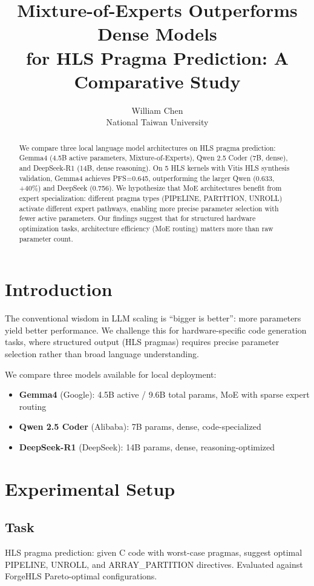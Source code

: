 \documentclass[11pt]{article}
\title{Mixture-of-Experts Outperforms Dense Models\\
for HLS Pragma Prediction: A Comparative Study}
\author{William Chen\\National Taiwan University}
\date{}
\begin{document}
\maketitle

\begin{abstract}
We compare three local language model architectures on HLS pragma
prediction: Gemma4 (4.5B active parameters, Mixture-of-Experts),
Qwen 2.5 Coder (7B, dense), and DeepSeek-R1 (14B, dense reasoning).
On 5 HLS kernels with Vitis HLS synthesis validation, Gemma4 achieves
PFS=0.645, outperforming the larger Qwen (0.633, +40\%) and DeepSeek
(0.756). We hypothesize that MoE architectures benefit from expert
specialization: different pragma types (PIPELINE, PARTITION, UNROLL)
activate different expert pathways, enabling more precise parameter
selection with fewer active parameters. Our findings suggest that
for structured hardware optimization tasks, architecture efficiency
(MoE routing) matters more than raw parameter count.
\end{abstract}

\section{Introduction}

The conventional wisdom in LLM scaling is ``bigger is better'':
more parameters yield better performance. We challenge this for
hardware-specific code generation tasks, where structured output
(HLS pragmas) requires precise parameter selection rather than
broad language understanding.

We compare three models available for local deployment:
\begin{itemize}
    \item \textbf{Gemma4} (Google): 4.5B active / 9.6B total params,
    MoE with sparse expert routing
    \item \textbf{Qwen 2.5 Coder} (Alibaba): 7B params, dense,
    code-specialized
    \item \textbf{DeepSeek-R1} (DeepSeek): 14B params, dense,
    reasoning-optimized
\end{itemize}

\section{Experimental Setup}

\subsection{Task}
HLS pragma prediction: given C code with worst-case pragmas,
suggest optimal PIPELINE, UNROLL, and ARRAY\_PARTITION directives.
Evaluated against ForgeHLS Pareto-optimal configurations.
\end{document}
